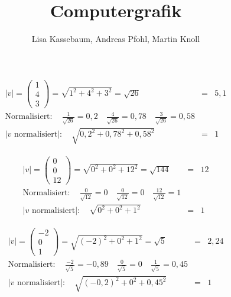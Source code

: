 \documentclass[a4paper]{article}
\title{Computergrafik}
\author{Lisa Kassebaum, Andreas Pfohl, Martin Knoll}
\begin{document}
\maketitle
\section{}
\subsection{}
  \begin{align*}
    \left|v\right|
    =
    \begin{pmatrix}
      1 \\ 4 \\ 3
    \end{pmatrix}
    =
    \sqrt{1^2 + 4^2 + 3^2}
    = \sqrt{26} &=& 5,1
    \\[1em]
    \text{Normalisiert}: \quad \frac{1}{\sqrt{26}} = 0,2 \quad \frac{4}{\sqrt{26}} = 0,78 \quad \frac{3}{\sqrt{26}} = 0,58
    \\[1em]
    \left|v\text{ normalisiert}\right|: \quad \sqrt{0,2^2 + 0,78^2 + 0,58^2} &=& 1
  \end{align*}

  \begin{align*}
    \left|v\right|
    =
    \begin{pmatrix}
      0 \\ 0 \\ 12
    \end{pmatrix}
    =
    \sqrt{0^2 + 0^2 + 12^2}
    = \sqrt{144} &=& 12
    \\[1em]
    \text{Normalisiert}: \quad \frac{0}{\sqrt{12}} = 0 \quad \frac{0}{\sqrt{12}} = 0 \quad \frac{12}{\sqrt{12}} = 1
    \\[1em]
    \left|v\text{ normalisiert}\right|: \quad \sqrt{0^2 + 0^2 + 1^2} &=& 1
  \end{align*}

  \begin{align*}
    \left|v\right|
    =
    \begin{pmatrix}
      -2 \\ 0 \\ 1
    \end{pmatrix}
    =
    \sqrt{(-2)^2 + 0^2 + 1^2}
    = \sqrt{5} &=& 2,24
    \\[1em]
    \text{Normalisiert}: \quad \frac{-2}{\sqrt{5}} = -0,89 \quad \frac{0}{\sqrt{5}} = 0 \quad \frac{1}{\sqrt{5}} = 0,45
    \\[1em]
    \left|v\text{ normalisiert}\right|: \quad \sqrt{(-0,2)^2 + 0^2 + 0,45^2} &=& 1
  \end{align*}
\end{document}
